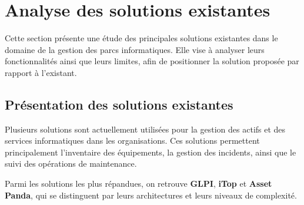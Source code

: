 \section{Analyse des solutions existantes}
\label{sec:etude_existants}

Cette section présente une étude des principales solutions existantes dans le domaine de la gestion des parcs informatiques. Elle vise à analyser leurs fonctionnalités ainsi que leurs limites, afin de positionner la solution proposée par rapport à l’existant.

\subsection{Présentation des solutions existantes}

Plusieurs solutions sont actuellement utilisées pour la gestion des actifs et des services informatiques dans les organisations. Ces solutions permettent principalement l’inventaire des équipements, la gestion des incidents, ainsi que le suivi des opérations de maintenance.

Parmi les solutions les plus répandues, on retrouve \textbf{GLPI}, \textbf{iTop} et \textbf{Asset Panda}, qui se distinguent par leurs architectures et leurs niveaux de complexité.

